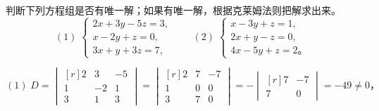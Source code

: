 \liti 判断下列方程组是否有唯一解；如果有唯一解，根据克莱姆法则把解求出来。
$$
(1) \; \begin{cases}
    2x + 3y - 5z = 3, \\
    x - 2y + z = 0, \\
    3x + y + 3z = 7,
\end{cases} \qquad
(2) \; \begin{cases}
    x - 3y + z = 1, \\
    2x + y - z = 0, \\
    4x - 5y + z = 2 \text{。}
\end{cases}
$$

\jie

$
    (1)\; D = \begin{vmatrix*}[r]
        2 & 3  & -5 \\
        1 & -2 & 1 \\
        3 & 1  & 3
    \end{vmatrix*} = \begin{vmatrix*}[r]
        2 & 7 & -7 \\
        1 & 0 & 0 \\
        3 & 7 & 0
    \end{vmatrix*} = - \begin{vmatrix*}[r]
        7 & -7 \\
        7 & 0
    \end{vmatrix*} = -49 \neq 0 \text{，}
$

